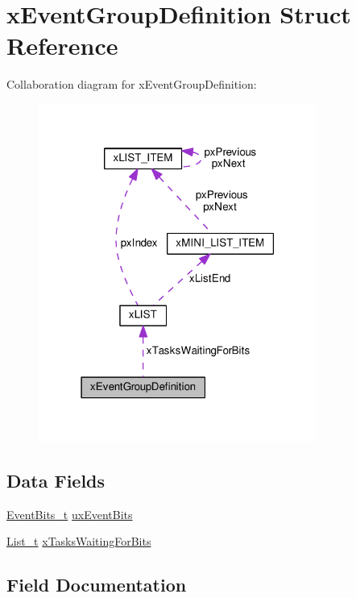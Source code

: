 \hypertarget{structxEventGroupDefinition}{}\section{x\+Event\+Group\+Definition Struct Reference}
\label{structxEventGroupDefinition}


Collaboration diagram for x\+Event\+Group\+Definition\+:\nopagebreak
\begin{figure}[H]
\begin{center}
\leavevmode
\includegraphics[width=259pt]{df/d63/structxEventGroupDefinition__coll__graph}
\end{center}
\end{figure}
\subsection*{Data Fields}
\begin{DoxyCompactItemize}
\item 
\hyperlink{event__groups_8h_ab2f21b93db0b2a0ab64d7a81ff32ac2e}{Event\+Bits\+\_\+t} \hyperlink{structxEventGroupDefinition_ad7c19a46f5f4557e466209962b5e4610}{ux\+Event\+Bits}
\item 
\hyperlink{list_8h_afd590ef6400071b4d63d65ef90bea7f4}{List\+\_\+t} \hyperlink{structxEventGroupDefinition_a6570ba98d93dcba9cb03de0c62df9044}{x\+Tasks\+Waiting\+For\+Bits}
\end{DoxyCompactItemize}


\subsection{Field Documentation}
